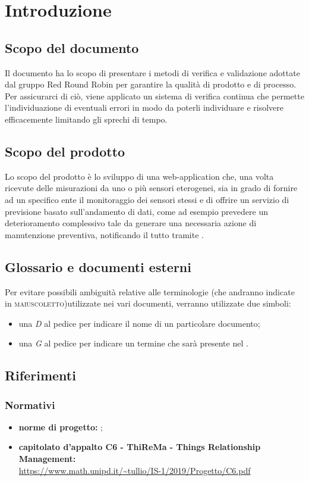 \section{Introduzione}
	\subsection{Scopo del documento}
		Il documento ha lo scopo di presentare i metodi di verifica e validazione adottate dal gruppo Red Round Robin per garantire la qualità di prodotto e di processo. Per assicurarci di ciò, viene applicato un sistema di verifica continua che permette l'individuazione di eventuali errori in modo da poterli individuare e risolvere efficacemente limitando gli sprechi di tempo.
	\subsection{Scopo del prodotto}
		Lo scopo del prodotto è lo sviluppo di una web-application che, una volta ricevute delle misurazioni da uno o più sensori eterogenei, sia in grado di fornire ad un specifico ente il monitoraggio dei sensori stessi e di offrire un servizio di previsione basato sull'andamento di dati, come ad esempio prevedere un deterioramento complessivo tale da generare una necessaria azione di manutenzione preventiva, notificando il tutto tramite .

	\subsection{Glossario e documenti esterni}
		Per evitare possibili ambiguità relative alle terminologie (che andranno indicate in \textsc{maiuscoletto})utilizzate nei vari documenti, verranno utilizzate due simboli:
		\begin{itemize}
			\item una \textit{D} al pedice per indicare il nome di un particolare documento;
			\item una \textit{G} al pedice per indicare un termine che sarà 
			presente nel .
		\end{itemize}

	\subsection{Riferimenti}
		\subsubsection{Normativi}
		\begin{itemize}
			\item \textbf{norme di progetto:} ;
			\item \textbf{capitolato d’appalto C6 - ThiReMa - Things Relationship Management:}\\
			\url{https://www.math.unipd.it/~tullio/IS-1/2019/Progetto/C6.pdf}
		\end{itemize}
